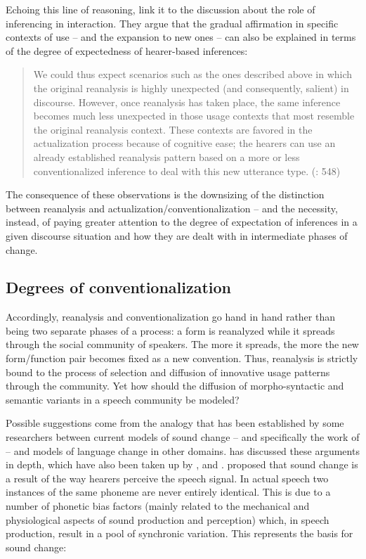 Echoing this line of reasoning, \citet{EhmerRosemeyer2018} link it to the discussion about the role of inferencing in interaction. They argue that the gradual affirmation in specific contexts of use – and the expansion to new ones – can also be explained in terms of the degree of expectedness of hearer-based inferences:

\begin{quote}
We could thus expect scenarios such as the ones described above in which the original reanalysis is highly unexpected (and consequently, salient) in discourse. However, once reanalysis has taken place, the same inference becomes much less unexpected in those usage contexts that most resemble the original reanalysis context. These contexts are favored in the actualization process because of cognitive ease; the hearers can use an already established reanalysis pattern based on a more or less conventionalized inference to deal with this new utterance type. (\citealt{EhmerRosemeyer2018}: 548)
\end{quote}

The consequence of these observations is the downsizing of the distinction between reanalysis and actualization/conventionalization – and the necessity, instead, of paying greater attention to the degree of expectation of inferences in a given discourse situation and how they are dealt with in intermediate phases of change.

\subsection{Degrees of conventionalization}
\hypertarget{Toc124860637}{}
Accordingly, reanalysis and conventionalization go hand in hand rather than being two separate phases of a process: a form is reanalyzed while it spreads through the social community of speakers. The more it spreads, the more the new form/function pair becomes fixed as a new convention. Thus, reanalysis is strictly bound to the process of selection and diffusion of innovative usage patterns through the community. Yet how should the diffusion of morpho-syntactic and semantic variants in a speech community be modeled?

Possible suggestions come from the analogy that has been established by some researchers between current models of sound change – and specifically the work of \citet{Ohala1981,Ohala1993} – and models of language change in other domains. \citet{Croft2000,Croft2010} has discussed these arguments in depth, which have also been taken up by \citet{Waltereit2012}, \citet{GrossmanNoveck2015} and \citet{EhmerRosemeyer2018}. \citet{Ohala1981,Ohala1993} proposed that sound change is a result of the way hearers perceive the speech signal. In actual speech two instances of the same phoneme are never entirely identical. This is due to a number of phonetic bias factors (mainly related to the mechanical and physiological aspects of sound production and perception) which, in speech production, result in a pool of synchronic variation. This represents the basis for sound change:

